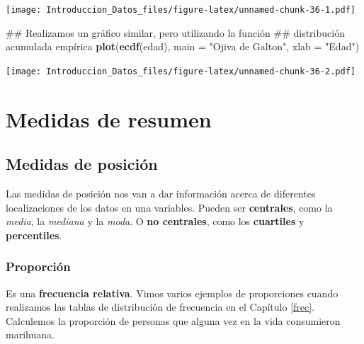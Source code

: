 \documentclass[spanish,]{book}
\newenvironment{Shaded}{\begin{snugshade}}{\end{snugshade}}
\newcommand{\KeywordTok}[1]{\textcolor[rgb]{0.13,0.29,0.53}{\textbf{#1}}}
\newcommand{\DataTypeTok}[1]{\textcolor[rgb]{0.13,0.29,0.53}{#1}}
\newcommand{\StringTok}[1]{\textcolor[rgb]{0.31,0.60,0.02}{#1}}
\newcommand{\OperatorTok}[1]{\textcolor[rgb]{0.81,0.36,0.00}{\textbf{#1}}}
\newcommand{\NormalTok}[1]{#1}
\begin{document}
\texttt{[image: Introduccion\_Datos\_files/figure-latex/unnamed-chunk-36-1.pdf]}

\begin{Shaded}
\begin{Highlighting}[]
\NormalTok{## Realizamos un gráfico similar, pero utilizando la función}
\NormalTok{## distribución acumulada empírica}
\KeywordTok{plot}\NormalTok{(}\KeywordTok{ecdf}\NormalTok{(edad),}
     \DataTypeTok{main =} \StringTok{"Ojiva de Galton"}\NormalTok{,}
     \DataTypeTok{xlab =} \StringTok{"Edad"}\NormalTok{)}
\end{Highlighting}
\end{Shaded}

\texttt{[image: Introduccion\_Datos\_files/figure-latex/unnamed-chunk-36-2.pdf]}

\chapter{Medidas de resumen}\label{medidas-de-resumen}

\section{Medidas de posición}\label{medidas-de-posicion}

Las medidas de posición nos van a dar información acerca de diferentes
localizaciones de los datos en una variables. Pueden ser
\textbf{centrales}, como la \emph{media}, la \emph{mediana} y la
\emph{moda}. O \textbf{no centrales}, como los \textbf{cuartiles} y
\textbf{percentiles}.

\subsection{Proporción}\label{proporcion}

Es una \textbf{frecuencia relativa}. Vimos varios ejemplos de
proporciones cuando realizamos las tablas de distribución de frecuencia
en el Capítulo \ref{frec}. Calculemos la proporción de personas que
alguna vez en la vida consumieron marihuana.

\begin{Shaded}
\end{Shaded}
\end{document}

